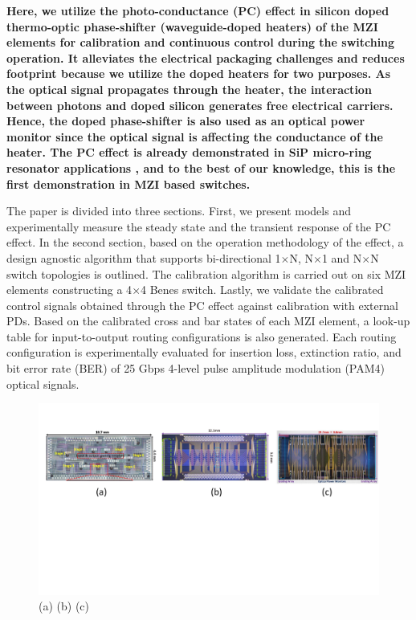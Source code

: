 \textbf{Here, we utilize the photo-conductance (PC) effect in silicon doped thermo-optic phase-shifter (waveguide-doped heaters) \cite{Harris_heater} of the MZI elements for calibration and continuous control during the switching operation. It alleviates the electrical packaging challenges and reduces footprint because we utilize the doped heaters for two purposes. As the optical signal propagates through the heater, the interaction between photons and doped silicon generates free electrical carriers. Hence, the doped phase-shifter is also used as an optical power monitor since the optical signal is affecting the conductance of the heater\cite{Dong_PC}. The PC effect is already demonstrated in SiP micro-ring resonator applications \cite{Chrotowski_PC,Gazman_PC,Zhou_PC}, and to the best of our knowledge, this is the first demonstration in MZI based switches.} 

The paper is divided into three sections. First, we present models and experimentally measure the steady state and the transient response of the PC effect. In the second section, based on the operation methodology of the effect, a design agnostic algorithm that supports bi-directional 1$\times$N\cite{Guan_1xN}, N$\times$1 \cite{Horst_mux} and N$\times$N switch topologies is outlined. The calibration algorithm is carried out on six MZI elements constructing a 4$\times$4 Benes switch. Lastly, we validate the calibrated control signals obtained through the PC effect against calibration with external PDs. Based on the calibrated cross and bar states of each MZI element, a look-up table for input-to-output routing configurations is also generated. Each routing configuration is experimentally evaluated for insertion loss, extinction ratio, and bit error rate (BER) of 25 Gbps 4-level pulse amplitude modulation (PAM4) optical signals. 

\begin{figure}[t!]
\centering\includegraphics[clip, trim=0cm 8cm 0cm 1cm,width=15cm]{Chapter5/CH_5_fig1.pdf}
\caption{(a) (b) (c)}
\end{figure}






